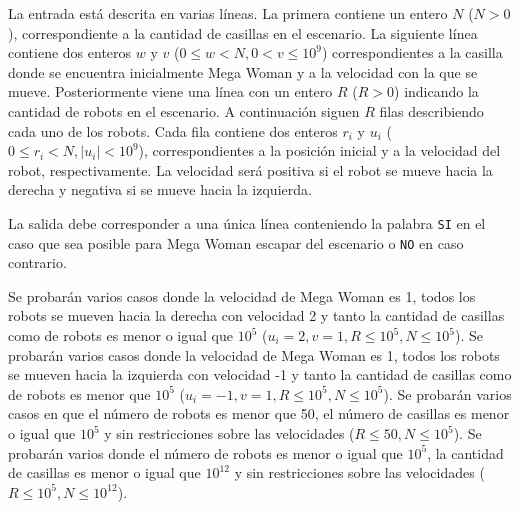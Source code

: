 \documentclass{oci}
\begin{document}
\begin{problemDescription}
\end{problemDescription}

\begin{inputDescription}
  La entrada está descrita en varias líneas.
  La primera contiene un entero $N$ ($N>0$), correspondiente a la cantidad de
  casillas en el escenario.
  La siguiente línea contiene dos enteros $w$ y $v$ ($0\leq w< N, 0<v\leq 10^9$)
  correspondientes a la casilla donde se encuentra inicialmente Mega Woman y a la
  velocidad con la que se mueve.
  Posteriormente viene una línea con un entero $R$ ($R>0$) indicando la cantidad de
  robots en el escenario.
  A continuación siguen $R$ filas describiendo cada uno de los robots.
  Cada fila contiene dos enteros $r_i$ y $u_i$ ($0\leq r_i < N, |u_i|< 10^9$),
  correspondientes a la posición inicial y a la velocidad del
  robot, respectivamente.
  La velocidad será positiva si el robot se mueve hacia la derecha y negativa si
  se mueve hacia la izquierda.
\end{inputDescription}

\begin{outputDescription}
La salida debe corresponder a una única línea conteniendo la palabra \texttt{SI}
en el caso que sea posible para Mega Woman escapar del escenario o \texttt{NO}
en caso contrario.
\end{outputDescription}

\begin{scoreDescription}
   Se probarán varios casos donde la velocidad de Mega Woman es 1,
  todos los robots se mueven hacia la derecha con velocidad 2 y tanto la
  cantidad de casillas como de robots es menor o igual que $10^5$ ($u_i=2, v=1,
  R\leq 10^5, N\leq 10^5$).
   Se probarán varios casos donde la velocidad de Mega Woman es 1,
  todos los robots se mueven hacia la izquierda con velocidad -1 y tanto la cantidad
  de casillas como de robots es menor que $10^5$ ($u_i=-1, v=1, R\leq 10^5,
  N\leq 10^5$).
   Se probarán varios casos en que el número de robots es menor que
  50, el número de casillas es menor o igual que $10^5$ y sin restricciones sobre las
  velocidades ($R\leq 50, N\leq 10^5$).
   Se probarán varios donde el número de robots es menor o igual que
  $10^5$, la cantidad de casillas es menor o igual que $10^{12}$ y sin
  restricciones sobre las velocidades ($R\leq 10^5, N \leq10^{12}$).
\end{scoreDescription}

\begin{sampleDescription}
\end{sampleDescription}
\end{document}

